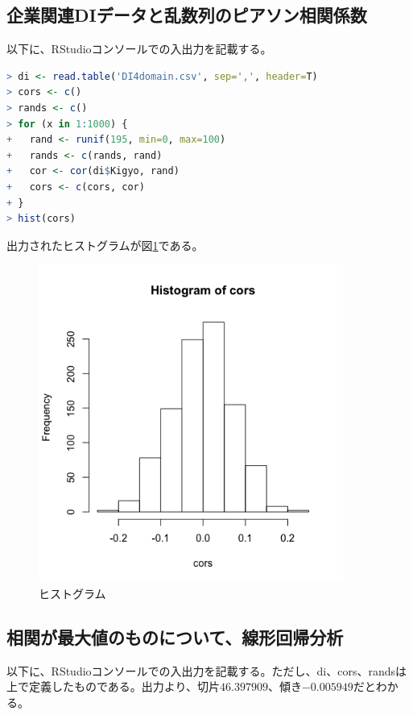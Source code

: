 \documentclass{jsarticle}
\begin{document}
\subsection{企業関連DIデータと乱数列のピアソン相関係数}

以下に、RStudioコンソールでの入出力を記載する。

\begin{lstlisting}[language=r]
> di <- read.table('DI4domain.csv', sep=',', header=T)
> cors <- c()
> rands <- c()
> for (x in 1:1000) {
+   rand <- runif(195, min=0, max=100)
+   rands <- c(rands, rand)
+   cor <- cor(di$Kigyo, rand)
+   cors <- c(cors, cor)
+ }
> hist(cors)
\end{lstlisting}

出力されたヒストグラムが図\ref{ex4}である。

\begin{figure}[H]
 \centering
   \includegraphics[width=100mm]{figures/ex4.png}
 \caption{ヒストグラム}
 \label{ex4}
\end{figure}

\subsection{相関が最大値のものについて、線形回帰分析}

以下に、RStudioコンソールでの入出力を記載する。ただし、di、cors、randsは上で定義したものである。出力より、切片$46.397909$、傾き$-0.005949$だとわかる。
\end{document}
